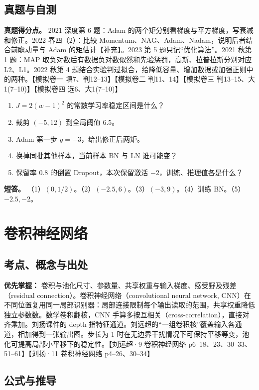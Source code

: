 \documentclass[UTF8,a4paper,zihao=-4,fontset=fandol]{ctexart}
\begin{document}
\subsection{真题与自测}

\textbf{真题得分点。} 2021 深度第 6 题：Adam 的两个矩分别看梯度与平方梯度，写衰减和修正。2022 春四（2）：比较 Momentum、NAG、Adam、Nadam，说明后者结合前瞻动量与 Adam 的矩估计【补充】。2023 第 5 题只记“优化算法”。2021 秋第 1 题：MAP 取负对数后有数据负对数似然和先验惩罚，高斯、拉普拉斯分别对应 L2、L1。2022 秋第 4 题结合实验判过拟合，给降低容量、增加数据或加强正则中的两种。【模拟卷一 填7、判12--13】【模拟卷二 判11、14】【模拟卷三 判13--15、大1(7--10)】【模拟卷四 选6、大1(7--10)】

\begin{enumerate}
\item $J=2(w-1)^2$ 的常数学习率稳定区间是什么？
\item 裁剪 $(-5,12)$ 到全局阈值 $6.5$。
\item Adam 第一步 $g=-3$，给出修正后两矩。
\item 换掉同批其他样本，当前样本 BN 与 LN 谁可能变？
\item 保留率 $0.8$ 的倒置 Dropout，本次保留激活 $-2$，训练、推理值各是什么？
\end{enumerate}
\textbf{短答。} （1）$(0,1/2)$。（2）$(-2.5,6)$。（3）$(-3,9)$。（4）训练 BN。（5）$-2.5,-2$。

\section{卷积神经网络}
\subsection{考点、概念与出处}

\textbf{优先掌握：} 卷积与池化尺寸、参数量、共享权重与输入梯度、感受野及残差（residual connection）。卷积神经网络（convolutional neural network, CNN）在不同位置复用同一局部识别器：局部连接限制每个输出读取的范围，共享权重降低独立参数数。数学卷积翻核，CNN 手算多按互相关（cross-correlation），直接对齐乘加。刘扬课件的 depth 指特征通道。刘远超的“一组卷积核”覆盖输入各通道，相加得到一张输出图。步长为 1 时在无边界干扰情况下可保持平移等变，池化可提高局部小平移下的稳定性。【刘远超·9 卷积神经网络 p6--18、23、30--33、51--61】【刘扬·11 卷积神经网络 p4--26、30--34】

\subsection{公式与推导}
\end{document}
